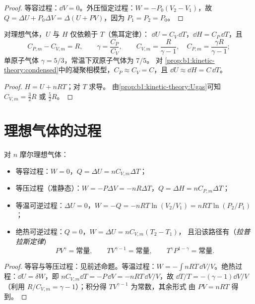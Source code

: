 \begin{proof}
等容过程：$\dd V = 0$。外压恒定过程：$W = -P_0(V_2 - V_1)$，故 $Q = \Delta U +
P_0\Delta V = \Delta(U + PV)$，因为 $P_1 = P_2 = P_0$。
\end{proof}

\begin{proposition}\label{prop:b1:first-law:gas}
对理想气体，$U$ 与 $H$ 仅依赖于 $T$（焦耳定律）：
$\dd U = C_V\,\dd T$，$\dd H = C_P\,\dd T$，且
\[
C_{P,m} - C_{V,m} = R, \qquad \gamma = \frac{C_P}{C_V}, \qquad
C_{V,m} = \frac{R}{\gamma - 1}, \quad C_{P,m} = \frac{\gamma R}{\gamma - 1} ;
\]
单原子气体 $\gamma = 5/3$，常温下双原子气体为 $7/5$。
对
\cref{prop:b1:kinetic-theory:condensed}中的凝聚相模型，$C_P \approx C_V = C$，且
$\dd U \approx \dd H = C\,\dd T$。
\end{proposition}

\begin{proof}
$H = U + nRT$；对 $T$ 求导。
由\cref{prop:b1:kinetic-theory:Ugas}可知 $C_{V,m} = \tfrac32 R$ 或 $\tfrac52 R$。
\end{proof}

\section{理想气体的过程}

\begin{proposition}[四种典型过程]\label{prop:b1:first-law:transformations}
对 $n$ 摩尔理想气体：
\begin{itemize}
  \item 等容过程：$W = 0$，$Q = \Delta U = nC_{V,m}\Delta T$；
  \item 等压过程（准静态）：$W = -P\Delta V = -nR\Delta T$，$Q = \Delta H =
        nC_{P,m}\Delta T$；
  \item 等温可逆过程：$\Delta U = 0$，$W = -Q = -nRT\ln(V_2/V_1) =
        nRT\ln(P_2/P_1)$；
  \item 绝热可逆过程：$Q = 0$，$W = \Delta U = nC_{V,m}(T_2 - T_1)$，
        且沿该路径有（\emph{拉普拉斯定律}）
        \[
        PV^\gamma = \text{常量}, \qquad TV^{\gamma - 1} = \text{常量}, \qquad
        T^\gamma P^{1 - \gamma} = \text{常量} .
        \]
\end{itemize}
\end{proposition}

\begin{proof}
等容与等压过程：见前述命题。等温过程：$W =
-\int nRT\,\dd V/V$。绝热过程：$\dd U = \delta W$，即 $nC_{V,m}\dd T =
-P\,\dd V = -nRT\,\dd V/V$，故 $\dd T/T = -(\gamma - 1)\dd V/V$（利用
$R/C_{V,m} = \gamma - 1$）；积分得 $TV^{\gamma - 1}$ 为常数，其余形式
由 $PV = nRT$ 得到。
\end{proof}


